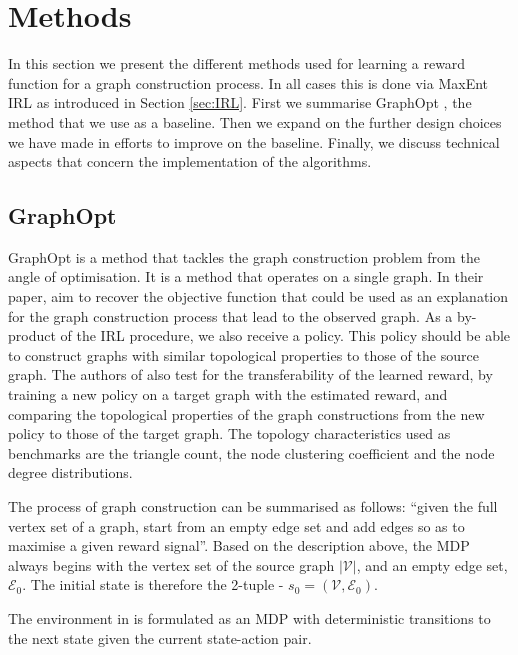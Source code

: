 \documentclass{report}
\numberwithin{equation}{section}
\numberwithin{figure}{section}
\numberwithin{table}{section}
\numberwithin{algorithm}{section}
\begin{document}
\chapter{Methods}\label{chap:methods}
In this section we present the different methods used 
for learning a reward function for a graph construction process. 
In all cases this is done via MaxEnt IRL as introduced in 
Section \ref{sec:IRL}.
First we summarise GraphOpt \citep{GraphOpt}, 
the method that we use as a baseline. Then we expand on the 
further design choices we have made in efforts to improve 
on the baseline. Finally, we discuss technical aspects that 
concern the implementation of the algorithms.

\section{GraphOpt}\label{sec:GraphOpt}
GraphOpt is a method that tackles the graph construction 
problem from the angle of optimisation. It is a method that 
operates on a single graph. In their paper, 
\cite{GraphOpt} aim to recover the objective function 
that could be used as an explanation for the graph construction 
process that lead to the observed graph. As a by-product 
of the IRL procedure, we also receive a policy. This policy 
should be able to construct graphs with similar topological 
properties to those of the source graph. The authors of \cite{GraphOpt} 
also test for the transferability of the learned reward, by 
training a new policy on a target graph with the estimated 
reward, and comparing the 
topological properties of the graph constructions from the 
new policy to those of the target graph. The 
topology characteristics used as 
benchmarks are the triangle count, the node clustering coefficient 
and the node degree distributions.

The process of graph construction can be summarised as follows: 
``given the full vertex set of a graph, start from 
an empty edge set and add edges so as to maximise 
a given reward signal''.
Based on the description above, the MDP always begins 
with the vertex set of the source graph $|\mathcal{V}|$, 
and an empty edge set, $\mathcal{E}_0$. The initial state is 
therefore the 2-tuple - $s_0=(\mathcal{V}, \mathcal{E}_0)$.

The environment in \cite{GraphOpt} is formulated as 
an MDP with deterministic transitions to the next state given the 
current state-action pair. 
\end{document}
